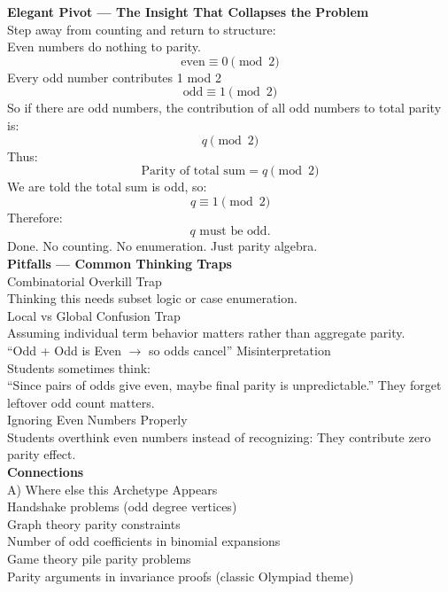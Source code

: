 \documentclass{article}
\begin{document}
\noindent \textbf{Elegant Pivot — The Insight That Collapses the Problem} \\
Step away from counting and return to structure: \\
Even numbers do nothing to parity.
\begin{equation*}
    \text{even} \equiv 0 \pmod{2}
\end{equation*}
Every odd number contributes 1 mod 2
\begin{equation*}
    \text{odd} \equiv 1 \pmod{2}
\end{equation*}
So if there are odd numbers, the contribution of all odd numbers to total parity is:
\begin{equation*}
    q \pmod{2}
\end{equation*}
Thus:
\begin{equation*}
    \text{Parity of total sum} = q \pmod{2}
\end{equation*}
We are told the total sum is odd, so:
\begin{equation*}
    q \equiv 1 \pmod{2}
\end{equation*}
Therefore:
\begin{equation*}
    q \text{ must be odd.}
\end{equation*}
Done. No counting. No enumeration. Just parity algebra. \\

\noindent \textbf{Pitfalls — Common Thinking Traps} \\
Combinatorial Overkill Trap \\
Thinking this needs subset logic or case enumeration. \\
Local vs Global Confusion Trap \\
Assuming individual term behavior matters rather than aggregate parity. \\
“Odd + Odd is Even $\to$ so odds cancel” Misinterpretation \\
Students sometimes think: \\
“Since pairs of odds give even, maybe final parity is unpredictable.” They forget leftover odd count matters. \\
Ignoring Even Numbers Properly \\
Students overthink even numbers instead of recognizing: They contribute zero parity effect. \\

\noindent \textbf{Connections} \\
A) Where else this Archetype Appears \\
Handshake problems (odd degree vertices) \\
Graph theory parity constraints \\
Number of odd coefficients in binomial expansions \\
Game theory pile parity problems \\
Parity arguments in invariance proofs (classic Olympiad theme) \\
\end{document}
